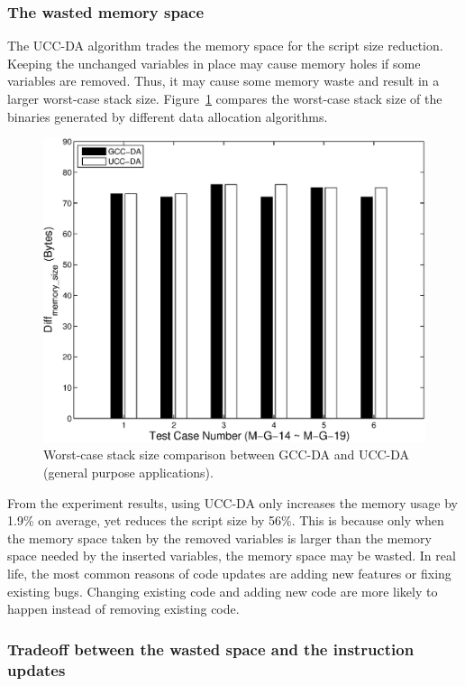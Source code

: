 \subsubsection{The wasted memory space}

The UCC-DA algorithm trades the memory space for the script size reduction. Keeping
the unchanged variables in place may cause memory holes if some variables are removed.
Thus, it may cause some memory waste and result in a larger worst-case stack size.
Figure~\ref{da-stack} compares the worst-case stack size of the binaries generated
by different data allocation algorithms.

\begin{figure}[htbp]
\centering
\includegraphics[scale=0.6]{./figures/stacksize.eps}
\caption{Worst-case stack size comparison between GCC-DA and UCC-DA (general purpose applications).}
\label{da-stack}
\vspace{-0.1in}
\end{figure}

From the experiment results, using UCC-DA only increases the memory usage by 1.9\% on average,
yet reduces the script size by 56\%.
This is because only when the memory space taken by the removed variables is larger than
the memory space needed by the inserted variables, the memory space may be wasted.
In real life, the most common reasons of code updates are adding new features or fixing existing bugs.
Changing existing code and adding new code are more likely to happen instead of removing 
existing code.

\subsubsection{Tradeoff between the wasted space and the instruction updates}

